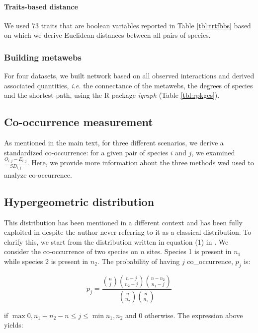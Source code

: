 \paragraph{Traits-based distance}\label{traits-based-distance-1}

We used 73 traits that are boolean variables reported in Table
\ref{tbl:trtfbbs} based on which we derive Euclidean distances between
all pairs of species.

\subsubsection{Building metawebs}\label{building-metawebs}

For four datasets, we built network based on all observed interactions
and derived associated quantities, \emph{i.e.} the connectance of the
metawebs, the degrees of species and the shortest-path, using the R
package \emph{igraph} (Table \ref{tbl:rpkges}).

\subsection{Co-occurrence measurement}\label{co-occurrence-measurement}

As mentioned in the main text, for three different scenarios, we derive
a standardized co-occurrence: for a given pair of species \(i\) and
\(j\), we examined \(\frac{O_{i,j}-E_{i,j}}{SD_{i,j}}\). Here, we
provide more information about the three methods wed used to analyze
co-occurrence.

\subsection{Hypergeometric
distribution}\label{hypergeometric-distribution}

This distribution has been mentioned in a different context
\citep[see][]{Gilpin1982} and has been fully exploited in
\citet{Veech2013} despite the author never referring to it as a
classical distribution. To clarify this, we start from the distribution
written in equation (1) in \citet{Veech2013}. We consider the
co-occurrence of two species on \(n\) sites. Species 1 is present in
\(n_1\) while species 2 is present in \(n_2\). The probability of having
\(j\) co\_occurrence, \(p_j\) is:

\[ p_j= \frac{\binom{n}{j} \binom{n-j}{n_2-j} \binom{n-n_2}{n_1-j}}{\binom{n}{n_2} \binom{n}{n_2}} \]

if \(\max{0, n_1+n_2-n} \leq j \leq \min{n_1, n_2}\) and 0 otherwise.
The expression above yields:

